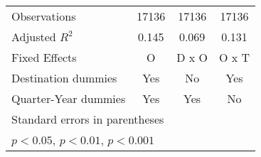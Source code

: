 \begin{table}[htbp]
\begin{tabular}{l*{3}{c}}
\hline
Observations        &       17136         &       17136         &       17136         \\
Adjusted \(R^{2}\)  &       0.145         &       0.069         &       0.131         \\
Fixed Effects       &           O         &       D x O         &       O x T         \\
Destination dummies &         Yes         &          No         &         Yes         \\
Quarter-Year dummies&         Yes         &         Yes         &          No         \\
\hline\hline
\multicolumn{4}{l}{\footnotesize Standard errors in parentheses}\\
\multicolumn{4}{l}{\footnotesize \sym{*} \(p<0.05\), \sym{**} \(p<0.01\), \sym{***} \(p<0.001\)}\\
\end{tabular}
\end{table}
